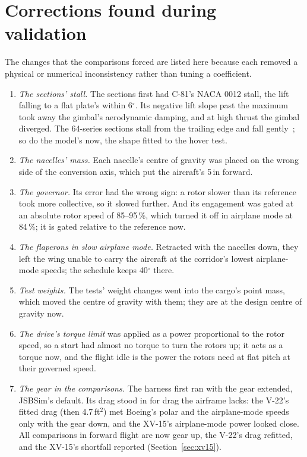 \documentclass[10pt,a4paper,twocolumn]{article}
\begin{document}
\section{Corrections found during validation}\label{sec:review}
The changes that the comparisons forced are listed here because each removed a physical or numerical inconsistency rather than tuning a coefficient.
\begin{enumerate}
\item \emph{The sections' stall.} The sections first had C-81's NACA 0012 stall, the lift falling to a flat plate's within 6$^\circ$. Its negative lift slope
past the maximum took away the gimbal's aerodynamic damping, and at high thrust the gimbal diverged. The 64-series sections stall from the trailing edge and fall
gently~\cite{nacar}; so do the model's now, the shape fitted to the hover test.
\item \emph{The nacelles' mass.} Each nacelle's centre of gravity was placed on the wrong side of the conversion axis, which put the aircraft's 5\,in forward.
\item \emph{The governor.} Its error had the wrong sign: a rotor slower than its reference took more collective, so it slowed further. And its engagement was
gated at an absolute rotor speed of 85--95\,\%, which turned it off in airplane mode at 84\,\%; it is gated relative to the reference now.
\item \emph{The flaperons in slow airplane mode.} Retracted with the nacelles down, they left the wing unable to carry the aircraft at the corridor's lowest
airplane-mode speeds; the schedule keeps 40$^\circ$ there.
\item \emph{Test weights.} The tests' weight changes went into the cargo's point mass, which moved the centre of gravity with them; they are at the design centre of
gravity now.
\item \emph{The drive's torque limit} was applied as a power proportional to the rotor speed, so a start had almost no torque to turn the rotors up; it acts as a
torque now, and the flight idle is the power the rotors need at flat pitch at their governed speed.
\item \emph{The gear in the comparisons.} The harness first ran with the gear extended, JSBSim's default. Its drag stood in for drag the airframe lacks: the V-22's
fitted drag (then 4.7\,ft$^2$) met Boeing's polar and the airplane-mode speeds only with the gear down, and the XV-15's airplane-mode power looked close. All comparisons
in forward flight are now gear up, the V-22's drag refitted, and the XV-15's shortfall reported (Section~\ref{sec:xv15}).

\end{enumerate}
\end{document}

